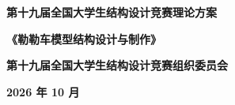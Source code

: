 \documentclass[UTF8,a4paper,12pt,fontset=none]{ctexart}
\numberwithin{equation}{section}
\numberwithin{figure}{section}
\numberwithin{table}{section}
\begin{document}
\songti{}

\thispagestyle{fancy}
\vspace*{0.6cm}
\begin{center}
{\heiti\bfseries{} 第十九届全国大学生结构设计竞赛理论方案}\par
\vspace{4.2cm}
{\heiti\bfseries{}《勒勒车模型结构设计与制作》}\par
\vfill
{\heiti\bfseries{} 第十九届全国大学生结构设计竞赛组织委员会}\par
\vspace{0.8cm}
{\heiti\bfseries{} 2026 年 10 月}\par
\end{center}
\newpage
\end{document}
